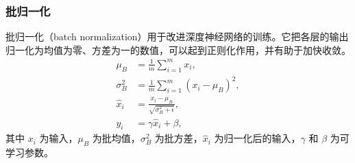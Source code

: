 \subsubsection{批归一化}
批归一化（batch normalization）用于改进深度神经网络的训练。它把各层的输出归一化为均值为零、方差为一的数值，可以起到正则化作用，并有助于加快收敛。
\begin{align}
\mu_B&=\frac1m\sum_{i=1}^{m}x_i,
\label{eq:appa-bn-mean}\\
\sigma_B^2&=\frac1m\sum_{i=1}^{m}(x_i-\mu_B)^2,
\label{eq:appa-bn-variance}\\
\hat{x}_i&=\frac{x_i-\mu_B}{\sqrt{\sigma_B^2+\epsilon}},
\label{eq:appa-bn-normalize}\\
y_i&=\gamma\hat{x}_i+\beta,
\label{eq:appa-bn-affine}
\end{align}
其中 $x_i$ 为输入，$\mu_B$ 为批均值，$\sigma_B^2$ 为批方差，$\hat{x}_i$ 为归一化后的输入，$\gamma$ 和 $\beta$ 为可学习参数。
